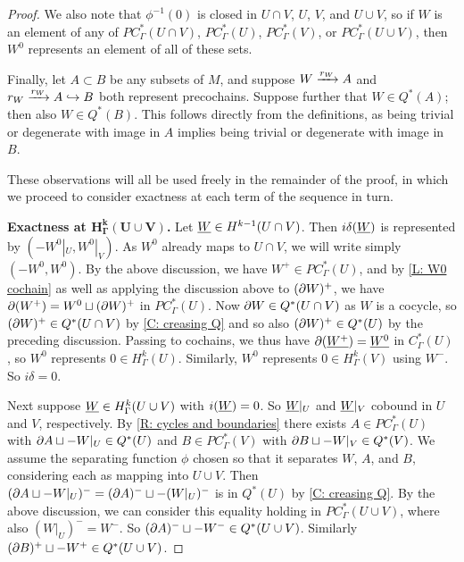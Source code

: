\begin{proof}
	We also note that $\phi^{-1}(0)$ is closed in $U \cap V$, $U$, $V$, and $U \cup V$, so if $W$ is an element of any of $PC_\Gamma^*(U \cap V)$, $PC_\Gamma^*(U)$, $PC_\Gamma^*(V)$, or $PC_\Gamma^*(U \cup V)$, then $W^0$ represents an element of all of these sets.

	Finally, let $A \subset B$ be any subsets of $M$, and suppose $W \xrightarrow{r_W} A$ and $r_W \xrightarrow{r_W} A \hookrightarrow B$ both represent precochains.
	Suppose further that $W \in Q^*(A)$; then also $W \in Q^*(B)$.
	This follows directly from the definitions, as being trivial or degenerate with image in $A$ implies being trivial or degenerate with image in $B$.

	These observations will all be used freely in the remainder of the proof, in which we proceed to consider exactness at each term of the sequence in turn.

	\textbf{Exactness at $\mathbf{H^k_\Gamma(U \cup V)}$.}
	Let $\underline{W} \in H^{k-1}(U \cap V)$.
	Then $i\delta(\underline{W})$ is represented by $(-W^0|_U, W^0|_V)$.
	As $W^0$ already maps to $U \cap V$, we will write simply $(-W^0, W^0)$.
	By the above discussion, we have $W^+ \in PC^*_\Gamma(U)$, and by \cref{L: W0 cochain} as well as applying the discussion above to $(\partial W)^+$, we have $\partial (W^+) = W^0 \sqcup (\partial W)^+$ in $PC^*_\Gamma(U)$.
	Now $\partial W \in Q^*(U \cap V)$ as $W$ is a cocycle, so $(\partial W)^+ \in Q^*(U \cap V)$ by \cref{C: creasing Q} and so also $(\partial W)^+ \in Q^*(U)$ by the preceding discussion.
	Passing to cochains, we thus have $\partial (\underline{W^+}) = \underline{W^0}$ in $C^*_\Gamma(U)$, so $W^0$ represents $0 \in H^k_\Gamma(U)$.
	Similarly, $W^0$ represents $0 \in H^k_\Gamma(V)$ using $W^-$.
	So $i\delta = 0$.

	Next suppose $\underline{W} \in H^k_\Gamma(U \cup V)$ with $i(\underline{W}) = 0$.
	So $\underline{W}|_U$ and $\underline{W}|_V$ cobound in $U$ and $V$, respectively.
	By \cref{R: cycles and boundaries} there exists $A \in PC^*_\Gamma(U)$ with $\partial A \sqcup - W|_U \in Q^*(U)$ and $B \in PC^*_\Gamma(V)$ with $\partial B \sqcup - W|_V \in Q^*(V)$.
	We assume the separating function $\phi$ chosen so that it separates $W$, $A$, and $B$, considering each as mapping into $U \cup V$.
	Then $(\partial A \sqcup - W|_U)^- = (\partial A)^- \sqcup - (W|_U)^-$ is in $Q^*(U)$ by \cref{C: creasing Q}.
	By the above discussion, we can consider this equality holding in $PC^*_\Gamma(U \cup V)$, where also $(W|_U)^- = W^-$.
	So $(\partial A)^- \sqcup - W^- \in Q^*(U \cup V)$.
	Similarly $(\partial B)^+ \sqcup - W^+ \in Q^*(U \cup V)$.


\end{proof}

